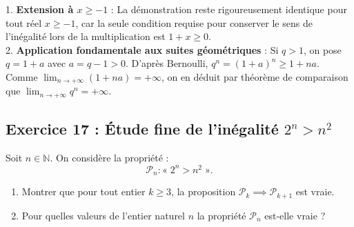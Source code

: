 \documentclass[11pt,a4paper]{article}
\newcommand{\N}{\mathbb{N}}
\begin{document}
\begin{remarquabox}
1. \textbf{Extension à $x \ge -1$} : La démonstration reste rigoureusement identique pour tout réel $x \ge -1$, car la seule condition requise pour conserver le sens de l'inégalité lors de la multiplication est $1+x \ge 0$.\\
2. \textbf{Application fondamentale aux suites géométriques} : Si $q > 1$, on pose $q = 1+a$ avec $a = q-1 > 0$. D'après Bernoulli, $q^n = (1+a)^n \ge 1 + na$. Comme $\lim_{n \to +\infty} (1+na) = +\infty$, on en déduit par théorème de comparaison que $\lim_{n \to +\infty} q^n = +\infty$.
\end{remarquabox}

\subsection*{Exercice 17 : Étude fine de l'inégalité $2^n > n^2$}

Soit $n \in \N$. On considère la propriété :
\[
\mathcal{P}_n : « \; 2^n > n^2 \; ».
\]
\begin{enumerate}
    \item Montrer que pour tout entier $k \ge 3$, la proposition $\mathcal{P}_k \implies \mathcal{P}_{k+1}$ est vraie.
    \item Pour quelles valeurs de l'entier naturel $n$ la propriété $\mathcal{P}_n$ est-elle vraie ?
\end{enumerate}
\end{document}
